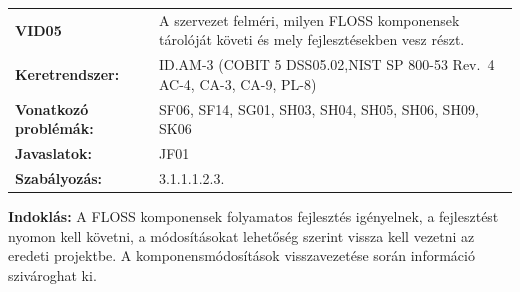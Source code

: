 \documentclass[12pt,magyar,a4paper,oneside]{scrreprt}
\begin{document}
\begin{longtable}[]{@{}ll@{}}
\toprule
\endhead
\begin{minipage}[t]{0.16\columnwidth}\raggedright
\textbf{VID05}\strut
\end{minipage} & \begin{minipage}[t]{0.79\columnwidth}\raggedright
A szervezet felméri, milyen FLOSS komponensek tárolóját követi és mely
fejlesztésekben vesz részt.\strut
\end{minipage}\tabularnewline
\begin{minipage}[t]{0.16\columnwidth}\raggedright
\textbf{Keretrendszer:}\strut
\end{minipage} & \begin{minipage}[t]{0.79\columnwidth}\raggedright
ID.AM-3 (COBIT 5 DSS05.02,NIST SP 800-53 Rev.~4 AC-4, CA-3, CA-9,
PL-8)\strut
\end{minipage}\tabularnewline
\begin{minipage}[t]{0.16\columnwidth}\raggedright
\textbf{Vonatkozó problémák:}\strut
\end{minipage} & \begin{minipage}[t]{0.79\columnwidth}\raggedright
SF06, SF14, SG01, SH03, SH04, SH05, SH06, SH09, SK06\strut
\end{minipage}\tabularnewline
\begin{minipage}[t]{0.16\columnwidth}\raggedright
\textbf{Javaslatok:}\strut
\end{minipage} & \begin{minipage}[t]{0.79\columnwidth}\raggedright
JF01\strut
\end{minipage}\tabularnewline
\begin{minipage}[t]{0.16\columnwidth}\raggedright
\textbf{Szabályozás:}\strut
\end{minipage} & \begin{minipage}[t]{0.79\columnwidth}\raggedright
3.1.1.1.2.3.\strut
\end{minipage}\tabularnewline
\bottomrule
\end{longtable}

\textbf{Indoklás: } A FLOSS komponensek folyamatos fejlesztés
igényelnek, a fejlesztést nyomon kell követni, a módosításokat lehetőség
szerint vissza kell vezetni az eredeti projektbe. A komponensmódosítások
visszavezetése során információ szivároghat ki.
\end{document}
